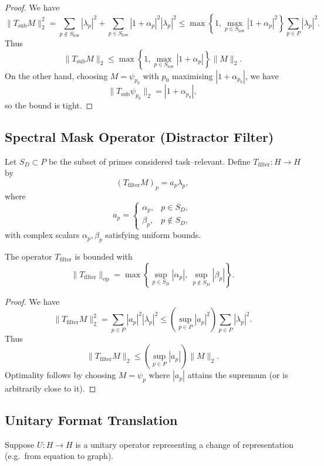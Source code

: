 \documentclass[11pt]{article}
\begin{document}
\begin{proof}
We have
\[
\|T_{\mathrm{sub}} M\|_2^2
= \sum_{p\notin S_{\text{low}}} |\lambda_p|^2
  + \sum_{p\in S_{\text{low}}} |1+\alpha_p|^2 |\lambda_p|^2
\leq \max\left\{1, \max_{p\in S_{\text{low}}} |1+\alpha_p|^2\right\} \sum_{p\in P} |\lambda_p|^2.
\]
Thus
\[
\|T_{\mathrm{sub}} M\|_2 \leq \max\left\{1, \max_{p\in S_{\text{low}}} |1+\alpha_p|\right\} \|M\|_2.
\]
On the other hand, choosing $M = \psi_{p_0}$ with $p_0$ maximising $|1+\alpha_{p_0}|$, we have
\[
\|T_{\mathrm{sub}} \psi_{p_0}\|_2 = |1+\alpha_{p_0}|,
\]
so the bound is tight.
\end{proof}

\subsection{Spectral Mask Operator (Distractor Filter)}

Let $S_D \subset P$ be the subset of primes considered task–relevant.
Define $T_{\mathrm{filter}}:H\to H$ by
\[
(T_{\mathrm{filter}} M)_p = a_p \lambda_p,
\]
where
\[
a_p =
\begin{cases}
\alpha_p, & p \in S_D,\\
\beta_p, & p \notin S_D,
\end{cases}
\]
with complex scalars $\alpha_p,\beta_p$ satisfying uniform bounds.

\begin{proposition}
\label{prop:Tfilter-norm}
The operator $T_{\mathrm{filter}}$ is bounded with
\[
\|T_{\mathrm{filter}}\|_{\mathrm{op}} = \max\left\{\sup_{p\in S_D} |\alpha_p|,\ \sup_{p\notin S_D} |\beta_p|\right\}.
\]
\end{proposition}

\begin{proof}
We have
\[
\|T_{\mathrm{filter}} M\|_2^2
= \sum_{p\in P} |a_p|^2 |\lambda_p|^2
\leq \left(\sup_{p\in P} |a_p|^2\right) \sum_{p\in P} |\lambda_p|^2.
\]
Thus
\[
\|T_{\mathrm{filter}} M\|_2 \leq \left(\sup_{p\in P} |a_p|\right) \|M\|_2.
\]
Optimality follows by choosing $M=\psi_p$ where $|a_p|$ attains the supremum (or is arbitrarily close to it).
\end{proof}

\subsection{Unitary Format Translation}

Suppose $U:H\to H$ is a unitary operator representing a change of representation (e.g.\ from equation to graph).
\end{document}
